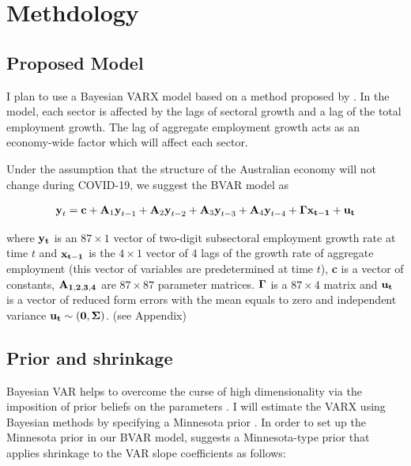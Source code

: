 \documentclass[11pt,a4paper,]{article}
\begin{document}
\hypertarget{methdology}{%
\section{Methdology}\label{methdology}}

\hypertarget{proposed-model}{%
\subsection{Proposed Model}\label{proposed-model}}

I plan to use a Bayesian VARX model based on a method proposed by \textcite{anderson2020}. In the model, each sector is affected by the lags of sectoral growth and a lag of the total employment growth. The lag of aggregate employment growth acts as an economy-wide factor which will affect each sector.

Under the assumption that the structure of the Australian economy will not change during COVID-19, we suggest the BVAR model as

\[
\begin{aligned}
\textbf{y}_t=\textbf{c}+\textbf{A}_1 \textbf{y}_{t-1}+\textbf{A}_2\textbf{y}_{t-2}+\textbf{A}_3\textbf{y}_{t-3}+\textbf{A}_4\textbf{y}_{t-4}+\bf{\Gamma}\textbf{x}_{t-1}+\bf{u}_t
\end{aligned}
\]

where \(\bf{y}_t\) is an \(87\times1\) vector of two-digit subsectoral employment growth rate at time \(t\) and \(\bf{x}_{t-1}\) is the \(4\times1\) vector of 4 lags of the growth rate of aggregate employment (this vector of variables are predetermined at time \(t\)), \textbf{c} is a vector of constants, \(\bf{A}_{1,2,3,4}\) are \(87\times87\) parameter matrices. \(\bf{\Gamma}\) is a \(87\times4\) matrix and \(\bf{u}_t\) is a vector of reduced form errors with the mean equals to zero and independent variance \(\bf{u}_t \sim (0,\bf{\Sigma})\). (see Appendix)

\hypertarget{prior-and-shrinkage}{%
\subsection{Prior and shrinkage}\label{prior-and-shrinkage}}

Bayesian VAR helps to overcome the curse of high dimensionality via the imposition of prior beliefs on the parameters \autocite{banbura2010large}. I will estimate the VARX using Bayesian methods by specifying a Minnesota prior \autocites[e.g.][]{anderson2020,litterman1986,robertson1999vector}. In order to set up the Minnesota prior in our BVAR model, \textcite{banbura2010large} suggests a Minnesota-type prior that applies shrinkage to the VAR slope coefficients as follows:
\end{document}
